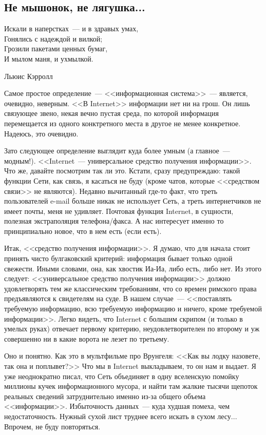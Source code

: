 \documentclass{scrbook}
\makeatletter
\newcommand{\defaultepigraphwidth}{0.5} %
\newcommand{\flqq}{<<}
\newcommand{\frqq}{>>}
\newcommand{\mdash}{~--- }
\newcommand{\essaysection}[1]{\subsection*{#1}\nopagebreak}
\newcommand{\myepigraph}[3][\@empty]{
	\ifx\@empty#1
		\setlength{\epigraphwidth}{\defaultepigraphwidth\textwidth}
	\else
		\setlength{\epigraphwidth}{#1\textwidth}
	\fi
	\epigraph{#2}{#3}
	\setlength{\epigraphwidth}{\defaultepigraphwidth\textwidth} %
	\nopagebreak
}
\makeatother
\begin{document}
\essaysection{Не мышонок, не лягушка...}

\myepigraph{Искали в наперстках{\mdash}и в здравых умах, \\
Гонялись с надеждой и вилкой; \\
Грозили пакетами ценных бумаг, \\
И мылом маня, и ухмылкой.}
{Льюис Кэрролл}

Самое простое определение{\mdash}{\flqq}информационная система{\frqq}{\mdash}является, очевидно, неверным. {\flqq}В Internet{\frqq} информации нет ни на грош. Он лишь связующее звено, некая вечно пустая среда, по которой информация перемещается из одного конктретного места в другое не менее конкретное. Надеюсь, это очевидно.

Зато следующее определение выглядит куда более умным (а главное{\mdash}модным!). {\flqq}Internet{\mdash}универсальное средство получения информации{\frqq}. Что же, давайте посмотрим так ли это. Кстати, сразу предупреждаю: такой функции Сети, как связь, я касаться не буду (кроме чатов, которые {\flqq}средством связи{\frqq} не являются). Недавно вычитанный где-то факт, что треть пользователей e-mail больше никак не использует Сеть, а треть интернетчиков не имеет почты, меня не удивляет. Почтовая функция Internet, в сущности, полезная экстраполяция телефона/факса. А нас интересует именно то принципиально новое, что в нем есть (если есть).

Итак, {\flqq}средство получения информации{\frqq}. Я думаю, что для начала стоит принять чисто булгаковский критерий: информация бывает только одной свежести. Иными словами, она, как хвостик Иа-Иа, либо есть, либо нет. Из этого следует: {\flqq}универсальное средство получения информации{\frqq} должно удовлетворять тем же классическим требованиям, что со времен римского права предъявляются к свидетелям на суде. В нашем случае{\mdash}{\flqq}поставлять требуемую информацию, всю требуемую информацию и ничего, кроме требуемой информации{\frqq}. Легко видеть, что Internet с большим скрипом (и только в умелых руках) отвечает первому критерию, неудовлетворителен по второму и уж совершенно ни в какие ворота не лезет по третьему.

Оно и понятно. Как это в мультфильме про Врунгеля: {\flqq}Как вы лодку назовете, так она и поплывет?{\frqq} Что мы в Internet выкладываем, то он нам и выдает. Я уже неоднократно писал, что Сеть объединяет в одну вселенскую помойку миллионы кучек информационного мусора, и найти там жалкие тысячи щепоток реальных сведений затруднительно именно из-за общего объема {\flqq}информации{\frqq}. Избыточность данных{\mdash}куда худшая помеха, чем недостаточность. Нужный сухой лист труднее всего искать в сухом лесу... Впрочем, не буду повторяться.
\end{document}
